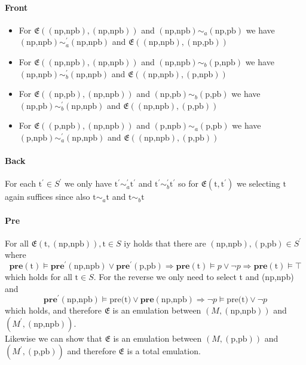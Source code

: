 \documentclass[a4paper,11pt]{article}
\begin{document}
\paragraph{Front}
\begin{itemize}
	\item For $\mathfrak{E}((\text{np,npb}),(\text{np,npb}))$ and $(\text{np,npb}) \sim_a (\text{np,pb})$ we have\\
		$(\text{np,npb}) \sim^\prime_a (\text{np,npb})$ and $\mathfrak{E}((\text{np,npb}),(\text{np,pb}))$
	\item For $\mathfrak{E}((\text{np,npb}),(\text{np,npb}))$ and $(\text{np,npb}) \sim_b (\text{p,npb})$ we have\\
		$(\text{np,npb}) \sim^\prime_b (\text{np,npb})$ and $\mathfrak{E}((\text{np,npb}),(\text{p,npb}))$
	\item For $\mathfrak{E}((\text{np,pb}),(\text{np,npb}))$ and $(\text{np,pb}) \sim_b (\text{p,pb})$ we have\\
		$(\text{np,pb}) \sim^\prime_b (\text{np,npb})$ and $\mathfrak{E}((\text{np,npb}),(\text{p,pb}))$
	\item For $\mathfrak{E}((\text{p,npb}),(\text{np,npb}))$ and $(\text{p,npb}) \sim_a (\text{p,pb})$ we have\\
		$(\text{p,npb}) \sim^\prime_a (\text{np,npb})$ and $\mathfrak{E}((\text{np,npb}),(\text{p,pb}))$
\end{itemize}

\paragraph{Back}
For each $\text{t}^\prime \in S^\prime$ we only have $\text{t}^\prime \sim^\prime_a \text{t}^\prime$ and $\text{t}^\prime \sim^\prime_b \text{t}^\prime$ so for $\mathfrak{E}(\text{t},\text{t}^\prime)$ we selecting $\text{t}$ again suffices since also $\text{t} \sim_a \text{t}$ and $\text{t} \sim_b \text{t}$

\paragraph{Pre}
For all $\mathfrak{E}(\text{t},(\text{np,npb})), \text{t} \in S$ iy holds that there are $(\text{np,npb}),(\text{p,pb}) \in S^\prime$ where
\[\textbf{pre}(\text{t}) \models \textbf{pre}^\prime(\text{np,npb}) \lor \textbf{pre}^\prime(\text{p,pb}) \Rightarrow \textbf{pre}(\text{t}) \models p \lor \neg p \Rightarrow \textbf{pre}(\text{t}) \models \top\]
which holds for all $\text{t} \in S$. For the reverse we only need to select t and (np,npb) and
\[\textbf{pre}^\prime(\text{np,npb}) \models \text{pre(t)} \lor \textbf{pre}(\text{np,npb}) \Rightarrow \neg p \models \text{pre(t)} \lor \neg p\]
which holds, and therefore $\mathfrak{E}$ is an emulation between $(M,(\text{np,npb}))$ and $(M^\prime,(\text{np,npb}))$.
\\[8pt]
Likewise we can show that $\mathfrak{E}$ is an emulation between $(M,(\text{p,pb}))$ and $(M^\prime,(\text{p,pb}))$ and therefore $\mathfrak{E}$ is a total emulation.
\end{document}
